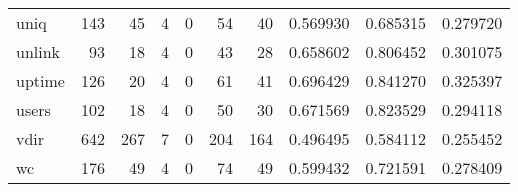 \begin{longtable}{lrrrrrrrrr}
uniq      &                                                143 &                                                 45 &                                                  4 &                                                  0 &                                                 54 &                                                 40 &                                           0.569930 &                               0.685315 &                             0.279720 \\
unlink    &                                                 93 &                                                 18 &                                                  4 &                                                  0 &                                                 43 &                                                 28 &                                           0.658602 &                               0.806452 &                             0.301075 \\
uptime    &                                                126 &                                                 20 &                                                  4 &                                                  0 &                                                 61 &                                                 41 &                                           0.696429 &                               0.841270 &                             0.325397 \\
users     &                                                102 &                                                 18 &                                                  4 &                                                  0 &                                                 50 &                                                 30 &                                           0.671569 &                               0.823529 &                             0.294118 \\
vdir      &                                                642 &                                                267 &                                                  7 &                                                  0 &                                                204 &                                                164 &                                           0.496495 &                               0.584112 &                             0.255452 \\
wc        &                                                176 &                                                 49 &                                                  4 &                                                  0 &                                                 74 &                                                 49 &                                           0.599432 &                               0.721591 &                             0.278409 \\

\end{longtable}
